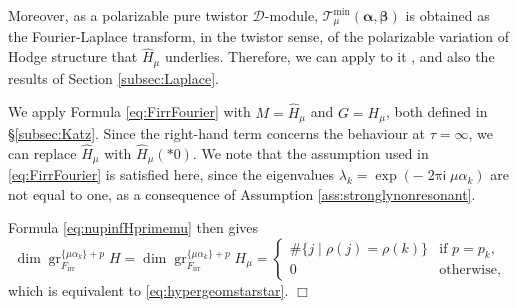 \documentclass[11pt]{article}
\let\mathcal\mathscr
\def\cD{\mathcal{D}}
\def\cT{\mathcal{T}}
\def\alphag{\boldsymbol{\alpha}}
\def\betag{\boldsymbol{\beta}}
\let\wh\widehat
\newcommand{\sfi}{\mathsf{i}}
\DeclareMathOperator{\twopii}{2\pi\sfi}
\newcommand{\irr}{{\mathrm{irr}}}
\DeclareMathOperator{\gr}{gr}
\begin{document}
Moreover, as a polarizable pure twistor $\cD$-module, $\cT_\mu^{\min}(\alphag,\betag)$ is obtained as the Fourier-Laplace transform, in the twistor sense, of the polarizable variation of Hodge structure that $\wh H_\mu$ underlies. Therefore, we can apply to it \cite[Prop.\,2.61]{Bibi15}, and also the results of Section \ref{subsec:Laplace}.

We apply Formula \eqref{eq:FirrFourier} with $M=\wh H_\mu$ and $G=H_\mu$, both defined in \S\ref{subsec:Katz}. Since the right-hand term concerns the behaviour at $\tau=\infty$, we can replace $\wh H_\mu$ with $\wh H_\mu(*0)$. We note that the assumption used in \eqref{eq:FirrFourier} is satisfied here, since the eigenvalues $\lambda_k=\exp(-\twopii\mu\alpha_k)$ are not equal to one, as a consequence of Assumption \eqref{ass:stronglynonresonant}.

Formula \eqref{eq:nupinfHprimemu} then gives\vspace*{-3pt}\enlargethispage{.7\baselineskip}%
$$
\dim\gr^{\{\mu\alpha_k\}+p}_{F_\irr}H=\dim\gr^{\{\mu\alpha_k\}+p}_{F_\irr}H_\mu=
\begin{cases}
\#\{j\mid\rho(j)=\rho(k)\}&\text{if }p=p_k,\\
0&\text{otherwise},
\end{cases}
$$
which is equivalent to \eqref{eq:hypergeomstarstar}.
\hfill $\Box$

 
 














\providecommand{\bysame}{\leavevmode\hbox to3em{\hrulefill}\thinspace}
\providecommand{\Zbl}[1]{\href{https://zbmath.org/#1}{Zbl-#1}}
%
%
\end{document}
